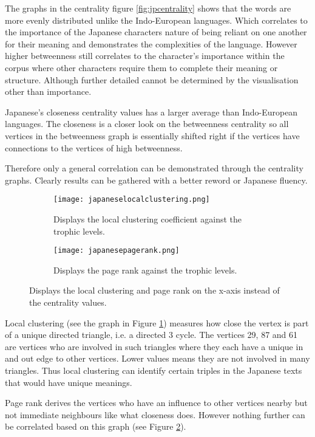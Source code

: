 The graphs in the centrality figure \ref{fig:jpcentrality} shows that the words are more evenly distributed unlike the Indo-European languages. Which correlates to the importance of the Japanese characters nature of being reliant on one another for their meaning and demonstrates the complexities of the language. However higher betweenness still correlates to the character's importance within the corpus where other characters require them to complete their meaning or structure. Although further detailed cannot be determined by the visualisation other than importance.

Japanese's closeness centrality values has a larger average than Indo-European languages. The closeness is a closer look on the betweenness centrality so all vertices in the betweenness graph is essentially shifted right if the vertices have connections to the vertices of high betweenness.

Therefore only a general correlation can be demonstrated through the centrality graphs. Clearly results can be gathered with a better reword or Japanese fluency.

\begin{figure}[H]
\centering
\begin{subfigure}{.45\textwidth}
	\hspace{-1cm} 
	\texttt{[image: japaneselocalclustering.png]}
	\caption{Displays the local clustering coefficient against the trophic levels.}
	\label{fig:jplc}
\end{subfigure}
\hfill
\begin{subfigure}{.45\textwidth}
	\hspace{-1cm} 
	\texttt{[image: japanesepagerank.png]}
	\caption{Displays the page rank against the trophic levels.}
	\label{fig:jppr}
\end{subfigure}
\caption{Displays the local clustering and page rank on the x-axis instead of the centrality values.}
\label{fig:jpother}
\end{figure}

Local clustering (see the graph in Figure \ref{fig:jplc}) measures how close the vertex is part of a unique directed triangle, i.e. a directed 3 cycle. The vertices 29, 87 and 61 are vertices who are involved in such triangles where they each have a unique in and out edge to other vertices. Lower values means they are not involved in many triangles. Thus local clustering can identify certain triples in the Japanese texts that would have unique meanings. 

Page rank derives the vertices who have an influence to other vertices nearby but not immediate neighbours like what closeness does. However nothing further can be correlated based on this graph (see Figure \ref{fig:jppr}).

